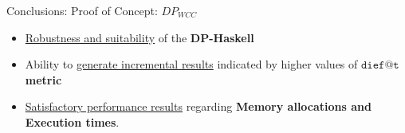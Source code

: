 
\begin{frame}[fragile]{Conclusions: Proof of Concept: $DP_{WCC}$}
  \begin{itemize}
    \setlength\itemsep{2em}
    \item \underline{\color{red}Robustness and suitability} of the \textbf{DP-Haskell}
    \item Ability to \underline{\color{red}generate incremental results} indicated by higher values of \textbf{$\mathtt{dief@t}$ metric}
    \item \underline{\color{red}Satisfactory performance results} regarding \textbf{Memory allocations and Execution times}. 
  \end{itemize}
\end{frame}

